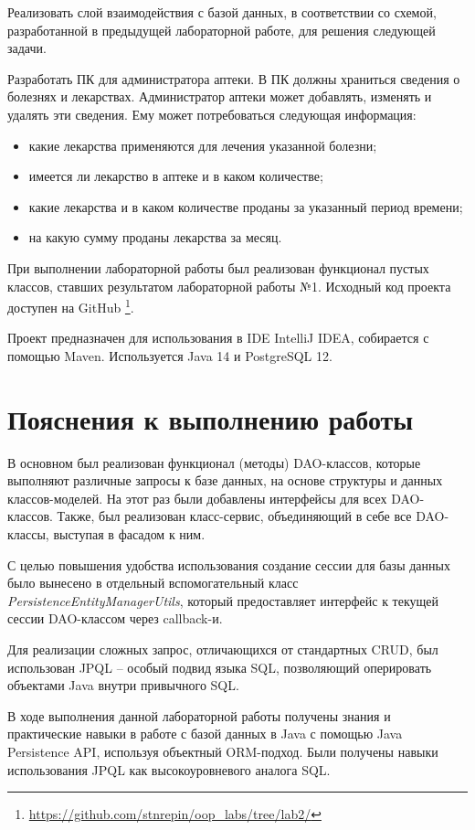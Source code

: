 \documentclass[a4paper,14pt]{extarticle}
\newcommand{\Code}[1]{\textit{#1}}
\begin{document}


\renewcommand*{\thepage}{}
\tableofcontents
\clearpage
\renewcommand*{\thepage}{\arabic{page}}

\setcounter{page}{3}


Реализовать слой взаимодействия с базой данных, в соответствии со схемой,
разработанной в предыдущей лабораторной работе, для решения следующей задачи.


Разработать ПК для администратора аптеки. В ПК должны
храниться сведения о болезнях и лекарствах. Администратор аптеки может
добавлять, изменять и удалять эти сведения. Ему может потребоваться
следующая информация:
\begin{itemize}
    \item какие лекарства применяются для лечения указанной болезни;
    \item имеется ли лекарство в аптеке и в каком количестве;
    \item какие лекарства и в каком количестве проданы за указанный период
        времени;
    \item на какую сумму проданы лекарства за месяц.
\end{itemize}


При выполнении лабораторной работы был реализован функционал пустых классов,
ставших результатом лабораторной работы №1. Исходный код проекта доступен на GitHub
\footnote{\url{https://github.com/stnrepin/oop_labs/tree/lab2/}}.

Проект предназначен для использования в IDE IntelliJ IDEA, собирается с помощью
Maven. Используется Java 14 и PostgreSQL 12.

\clearpage


\section{Пояснения к выполнению работы}

В основном был реализован функционал (методы) DAO-классов, которые выполняют
различные запросы к базе данных, на основе структуры и данных классов-моделей.
На этот раз были добавлены интерфейсы для всех DAO-классов.  Также, был
реализован класс-сервис, объединяющий в себе все DAO-классы, выступая в
фасадом к ним.

С целью повышения удобства использования создание сессии для базы данных было
вынесено в отдельный вспомогательный класс \Code{PersistenceEntityManagerUtils},
который предоставляет интерфейс к текущей сессии DAO-классом через
callback-и.

Для реализации сложных запрос, отличающихся от стандартных CRUD, был
использован JPQL -- особый подвид языка SQL, позволяющий оперировать объектами
Java внутри привычного SQL.


\clearpage



В ходе выполнения данной лабораторной работы получены знания и практические
навыки в работе с базой данных в Java с помощью Java Persistence API, используя
объектный ORM-подход. Были получены навыки использования JPQL как
высокоуровневого аналога SQL.
\end{document}

